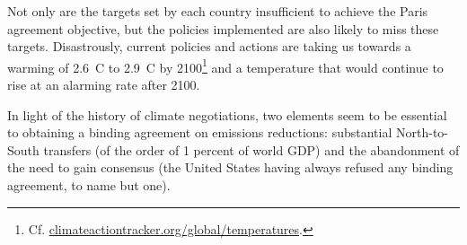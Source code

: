 \documentclass[a5paper,english,openany]{memoir}
\begin{document}
Not only are the targets set by each country insufficient to achieve the Paris agreement objective, but the policies implemented are also likely to miss these targets. Disastrously, %
current policies and actions are taking us towards a warming of 2.6~\textdegree{}C to 2.9~\textdegree{}C by 2100\footnote{Cf. \href{https://climateactiontracker.org/global/temperatures/}{climateactiontracker.org/global/temperatures}.} and a temperature that would continue to rise at an alarming rate after 2100. 

In %
light of the history of climate negotiations, two elements seem to be essential to obtaining a binding agreement on emissions reductions: substantial North-to-South %
transfers (of the order of 1 percent of world GDP) and the abandonment of the need to gain consensus %
(the United States having always refused any binding agreement, to name but one).
\end{document}
